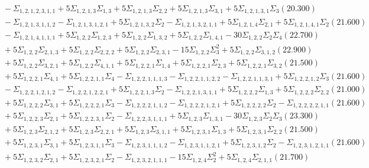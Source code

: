 \documentclass[12pt]{article}
\begin{document}
\begin{landscape}
\begin{align*}
		&\quad\quad -\Sigma_{1,2,1,2,3,1,1}+5\Sigma_{1,2,1,3}\Sigma_{1,3}+5\Sigma_{1,2,1,3}\Sigma_{2,2}+5\Sigma_{1,2,1,3}\Sigma_{3,1}+5\Sigma_{1,2,1,3,1}\Sigma_{3}(20.300) \\ 
		&\quad\quad -\Sigma_{1,2,1,3,1,1,2}-\Sigma_{1,2,1,3,1,2,1}+5\Sigma_{1,2,1,3,2}\Sigma_{2}-\Sigma_{1,2,1,3,2,1,1}+5\Sigma_{1,2,1,4}\Sigma_{2,1}+5\Sigma_{1,2,1,4,1}\Sigma_{2}(21.600) \\ 
		&\quad\quad -\Sigma_{1,2,1,4,1,1,1}+5\Sigma_{1,2,2}\Sigma_{1,2,3}+5\Sigma_{1,2,2}\Sigma_{1,3,2}+5\Sigma_{1,2,2}\Sigma_{1,4,1}-30\Sigma_{1,2,2}\Sigma_{2}\Sigma_{4}(22.700) \\ 
		&\quad\quad +5\Sigma_{1,2,2}\Sigma_{2,1,3}+5\Sigma_{1,2,2}\Sigma_{2,2,2}+5\Sigma_{1,2,2}\Sigma_{2,3,1}-15\Sigma_{1,2,2}\Sigma_{3}^{2}+5\Sigma_{1,2,2}\Sigma_{3,1,2}(22.900) \\ 
		&\quad\quad +5\Sigma_{1,2,2}\Sigma_{3,2,1}+5\Sigma_{1,2,2}\Sigma_{4,1,1}+5\Sigma_{1,2,2,1}\Sigma_{1,4}+5\Sigma_{1,2,2,1}\Sigma_{2,3}+5\Sigma_{1,2,2,1}\Sigma_{3,2}(21.500) \\ 
		&\quad\quad +5\Sigma_{1,2,2,1}\Sigma_{4,1}+5\Sigma_{1,2,2,1,1}\Sigma_{4}-\Sigma_{1,2,2,1,1,1,3}-\Sigma_{1,2,2,1,1,2,2}-\Sigma_{1,2,2,1,1,3,1}+5\Sigma_{1,2,2,1,2}\Sigma_{3}(21.600) \\ 
		&\quad\quad -\Sigma_{1,2,2,1,2,1,2}-\Sigma_{1,2,2,1,2,2,1}+5\Sigma_{1,2,2,1,3}\Sigma_{2}-\Sigma_{1,2,2,1,3,1,1}+5\Sigma_{1,2,2,2}\Sigma_{1,3}+5\Sigma_{1,2,2,2}\Sigma_{2,2}(21.000) \\ 
		&\quad\quad +5\Sigma_{1,2,2,2}\Sigma_{3,1}+5\Sigma_{1,2,2,2,1}\Sigma_{3}-\Sigma_{1,2,2,2,1,1,2}-\Sigma_{1,2,2,2,1,2,1}+5\Sigma_{1,2,2,2,2}\Sigma_{2}-\Sigma_{1,2,2,2,2,1,1}(21.600) \\ 
		&\quad\quad +5\Sigma_{1,2,2,3}\Sigma_{2,1}+5\Sigma_{1,2,2,3,1}\Sigma_{2}-\Sigma_{1,2,2,3,1,1,1}+5\Sigma_{1,2,3}\Sigma_{1,3,1}-30\Sigma_{1,2,3}\Sigma_{2}\Sigma_{3}(23.300) \\ 
		&\quad\quad +5\Sigma_{1,2,3}\Sigma_{2,1,2}+5\Sigma_{1,2,3}\Sigma_{2,2,1}+5\Sigma_{1,2,3}\Sigma_{3,1,1}+5\Sigma_{1,2,3,1}\Sigma_{1,3}+5\Sigma_{1,2,3,1}\Sigma_{2,2}(21.500) \\ 
		&\quad\quad +5\Sigma_{1,2,3,1}\Sigma_{3,1}+5\Sigma_{1,2,3,1,1}\Sigma_{3}-\Sigma_{1,2,3,1,1,1,2}-\Sigma_{1,2,3,1,1,2,1}+5\Sigma_{1,2,3,1,2}\Sigma_{2}-\Sigma_{1,2,3,1,2,1,1}(21.600) \\ 
		&\quad\quad +5\Sigma_{1,2,3,2}\Sigma_{2,1}+5\Sigma_{1,2,3,2,1}\Sigma_{2}-\Sigma_{1,2,3,2,1,1,1}-15\Sigma_{1,2,4}\Sigma_{2}^{2}+5\Sigma_{1,2,4}\Sigma_{2,1,1}(21.700) \\ 

\end{align*}
\end{landscape}
\end{document}
